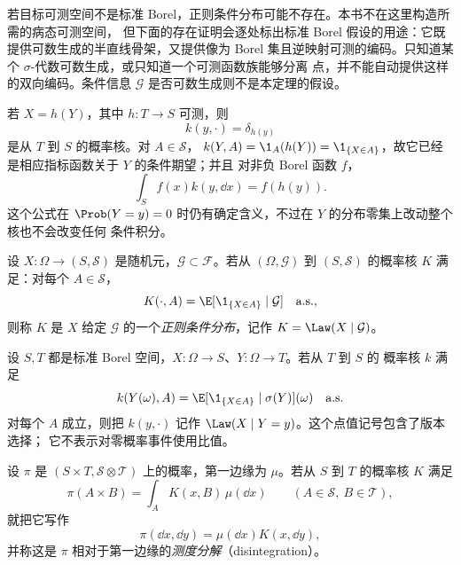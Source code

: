 \begin{remark}\label{ex:5-2-2-3}
若目标可测空间不是标准 Borel，正则条件分布可能不存在。本书不在这里构造所需的病态可测空间，
但下面的存在证明会逐处标出标准 Borel 假设的用途：它既提供可数生成的半直线骨架，又提供像为
Borel 集且逆映射可测的编码。只知道某个 $\sigma$-代数可数生成，或只知道一个可测函数族能够分离
点，并不能自动提供这样的双向编码。条件信息 $\mathcal G$ 是否可数生成则不是本定理的假设。
\end{remark}

\begin{example}[确定性条件核]\label{ex:5-2-2-4}
若 $X=h(Y)$，其中 $h:T\to S$ 可测，则
\[
 k(y,\cdot)=\delta_{h(y)}
\]
是从 $T$ 到 $S$ 的概率核。对 $A\in\mathcal S$，
$k(Y,A)=\1_A(h(Y))=\1_{\{X\in A\}}$，故它已经是相应指标函数关于 $Y$ 的条件期望；并且
对非负 Borel 函数 $f$，
\[
 \int_Sf(x)k(y,\dd x)=f(h(y)).
\]
这个公式在 $\Prob(Y=y)=0$ 时仍有确定含义，不过在 $Y$ 的分布零集上改动整个核也不会改变任何
条件积分。
\end{example}

\begin{definition}[正则条件分布]\label{def:5-2-2-1}
设 $X:\Omega\to(S,\mathcal S)$ 是随机元，$\mathcal G\subset\mathcal F$。若从
$(\Omega,\mathcal G)$ 到 $(S,\mathcal S)$ 的概率核 $K$ 满足：对每个 $A\in\mathcal S$，
\begin{equation}\label{eq:5-2-rcd-def}
 K(\cdot,A)=\E[\1_{\{X\in A\}}\mid\mathcal G]
 \quad\text{a.s.},
\end{equation}
则称 $K$ 是 $X$ 给定 $\mathcal G$ 的一个\emph{正则条件分布}，记作
$K=\Law(X\mid\mathcal G)$。
\end{definition}

\begin{definition}[给定随机变量的核]\label{def:5-2-2-2}
设 $S,T$ 都是标准 Borel 空间，$X:\Omega\to S$、$Y:\Omega\to T$。若从 $T$ 到 $S$ 的
概率核 $k$ 满足
\[
 k(Y(\omega),A)
 =\E[\1_{\{X\in A\}}\mid\sigma(Y)](\omega)
 \quad\text{a.s.}
\]
对每个 $A$ 成立，则把 $k(y,\cdot)$ 记作 $\Law(X\mid Y=y)$。这个点值记号包含了版本选择；
它不表示对零概率事件使用比值。
\end{definition}

\begin{definition}[测度分解]\label{def:5-2-2-3}
设 $\pi$ 是 $(S\times T,\mathcal S\otimes\mathcal T)$ 上的概率，第一边缘为 $\mu$。若从
$S$ 到 $T$ 的概率核 $K$ 满足
\begin{equation}\label{eq:5-2-disintegration-rectangles}
 \pi(A\times B)=\int_AK(x,B)\,\mu(\dd x)
 \qquad(A\in\mathcal S,\ B\in\mathcal T),
\end{equation}
就把它写作
\[
 \pi(\dd x,\dd y)=\mu(\dd x)K(x,\dd y),
\]
并称这是 $\pi$ 相对于第一边缘的\emph{测度分解}（disintegration）。
\end{definition}


